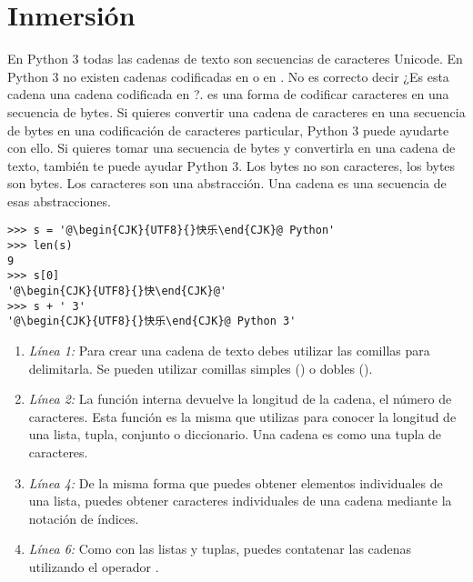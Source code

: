 \section{Inmersión}

En Python 3 todas las cadenas de texto son secuencias de caracteres Unicode. En Python 3 no existen cadenas codificadas en  o en . No es correcto decir ¿Es esta cadena una cadena codificada en ?.  es una forma de codificar caracteres en una secuencia de bytes. Si quieres convertir una cadena de caracteres en una secuencia de bytes en una codificación de caracteres particular, Python 3 puede ayudarte con ello. Si quieres tomar una secuencia de bytes y convertirla en una cadena de texto, también te puede ayudar Python 3. Los bytes no son caracteres, los bytes son bytes. Los caracteres son una abstracción. Una cadena es una secuencia de esas abstracciones.

\noindent\begin{minipage}{\textwidth}
\begin{lstlisting}[mathescape=True,escapeinside=@@]
>>> s = '@\begin{CJK}{UTF8}{}快乐\end{CJK}@ Python'
>>> len(s)
9
>>> s[0]
'@\begin{CJK}{UTF8}{}快\end{CJK}@'
>>> s + ' 3'
'@\begin{CJK}{UTF8}{}快乐\end{CJK}@ Python 3'
\end{lstlisting}
\end{minipage}

\begin{enumerate}

\item \emph{Línea 1:} Para crear una cadena de texto debes utilizar las comillas para delimitarla. Se pueden utilizar comillas simples () o dobles ().

\item \emph{Línea 2:} La función interna  devuelve la longitud de la cadena, el número de caracteres. Esta función es la misma que utilizas para conocer la longitud de una lista, tupla, conjunto o diccionario. Una cadena es como una tupla de caracteres.

\item \emph{Línea 4:} De la misma forma que puedes obtener elementos individuales de una lista, puedes obtener caracteres individuales de una cadena mediante la notación de índices.

\item \emph{Línea 6:} Como con las listas y tuplas, puedes contatenar las cadenas utilizando el operador \codigo{+}.

\end{enumerate}

